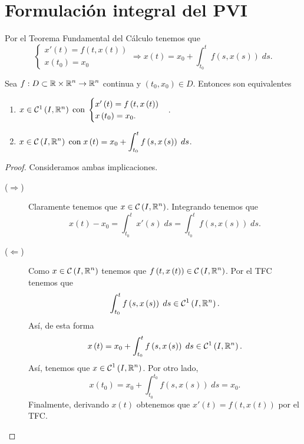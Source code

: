 \section{Formulación integral del PVI}
Por el Teorema Fundamental del Cálculo tenemos que 
\[
\begin{cases}
x'\left(t\right)=f\left(t, x\left(t\right)\right) \\
x\left(t_{0}\right)=x_{0}
\end{cases}
\Rightarrow x\left(t\right)=x_{0}+\int^{t}_{t_{0}} f\left(s, x\left(s\right)\right) \; d s.\]
\begin{prop}
Sea $\displaystyle f : D \subset \mathbb{R} \times \mathbb{R}^{n} \to \mathbb{R}^{n} $ continua y $\displaystyle \left(t_{0}, x_{0}\right)\in D $. Entonces son equivalentes
\begin{enumerate}
\item $x\in \mathcal{C}^{1}\left(I, \mathbb{R}^{n}\right) \; \text{con}\; 
\begin{cases}
x'\left(t\right)=f\left(t,x\left(t\right)\right) \\
x\left(t_{0}\right)=x_{0}. 
\end{cases}$.
\item $\displaystyle x \in \mathcal{C}\left(I, \mathbb{R}^{n}\right) \; \text{con}\; x\left(t\right)=x_{0} + \int^{t}_{t_{0}} f\left(s, x\left(s\right)\right) \; d s $.
\end{enumerate}
\end{prop}
\begin{proof}
Consideramos ambas implicaciones. 
\begin{description}
\item[($\Rightarrow$)] Claramente tenemos que $\displaystyle x \in \mathcal{C}\left(I, \mathbb{R}^{n}\right) $. Integrando tenemos que 
	\[x\left(t\right)-x_{0}=\int^{t}_{t_{0}} x'\left(s\right) \; d s = \int^{t}_{t_{0}} f\left(s, x\left(s\right)\right) \; d s .\]
\item[($\Leftarrow$)] Como $\displaystyle x \in \mathcal{C}\left(I, \mathbb{R}^{n}\right) $ tenemos que $\displaystyle f\left(t, x\left(t\right)\right) \in \mathcal{C}\left(I, \mathbb{R}^{n}\right)$. Por el TFC tenemos que 
	\[\int^{t}_{t_{0}} f\left(s, x\left(s\right)\right) \; d s \in \mathcal{C}^{1}\left(I, \mathbb{R}^{n}\right) .\]
	Así, de esta forma 
	\[x\left(t\right)=x_{0} + \int^{t}_{t_{0}} f\left(s, x\left(s\right)\right) \; d s \in \mathcal{C}^{1}\left(I, \mathbb{R}^{n}\right) .\]
Así, tenemos que $\displaystyle x \in \mathcal{C}^{1}\left(I, \mathbb{R}^{n}\right) $. Por otro lado, 
\[x\left(t_{0}\right)=x_{0} + \int^{t_{0}}_{t_{0}} f\left(s, x\left(s\right)\right) \; d s = x_{0} .\]
Finalmente, derivando $\displaystyle x\left(t\right) $ obtenemos que $\displaystyle x'\left(t\right)=f\left(t, x\left(t\right)\right) $ por el TFC. 
\end{description}
\end{proof}
